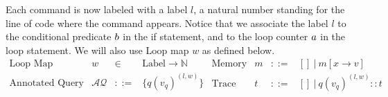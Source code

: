 Each command is now labeled with a label $l$, a natural number standing for the line of code where the command appears. Notice that we associate the label $l$ to the conditional predicate $b$ in the if statement, and to the loop counter $a$ in the loop statement. We will also use  Loop map $w$ as defined below.  
\[
\begin{array}{llll}
 \mbox{Loop Map} & w & \in & \mbox{Label} \to \mathbb{N} \\
%
\mbox{Annotated Query} & \mathcal{AQ}  & ::= & \{ q(v_q)^{(l,w)}  \} \\
\end{array}
\begin{array}{llll}
    \mbox{Memory} & m & ::= & [] ~|~ m[x \to v] \\
\mbox{Trace} & t & ::= & [] ~|~ q(v_q)^{(l, w) } :: t \\
\end{array}
\]

